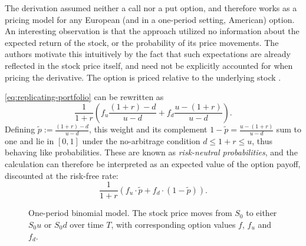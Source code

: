 \documentclass[english,12pt,a4paper,pdftex,sci,utf8]{aaltothesis}
\begin{document}
The derivation assumed neither a call nor a put option, and therefore works as a pricing model for any European (and in a one-period setting, American) option. An interesting observation is that the approach utilized no information about the expected return of the stock, or the probability of its price movements. The authors motivate this intuitively by the fact that such expectations are already reflected in the stock price itself, and need not be explicitly accounted for when pricing the derivative. The option is priced relative to the underlying stock \cite{hull2018}.\clearpage

\cref{eq:replicating-portfolio} can be rewritten as
\begin{equation*}
     \frac{1}{1+r}\left(f_u\frac{(1+r)-d}{u-d}+f_d\frac{u-(1+r)}{u-d}\right).
\end{equation*}
Defining $\tilde{p} := \frac{(1+r)-d}{u-d}$, this weight and its complement $1-\tilde{p} = \frac{u-(1+r)}{u-d}$ sum to one and lie in $[0,1]$ under the no-arbitrage condition $d \leq 1+r \leq u$, thus behaving like probabilities. These are known as \emph{risk-neutral probabilities}, and the calculation can therefore be interpreted as an expected value of the option payoff, discounted at the risk-free rate:
\begin{equation}
     \frac{1}{1+r}(f_u\cdot \tilde p + f_d \cdot (1-\tilde p)).
\label{eq:risk-neutral-expectancy}
\end{equation}

\begin{figure}[tbp]
    \centering
    \caption{One-period binomial model. The stock price moves from $S_0$ to either $S_0u$ or $S_0d$ over time $T$, with corresponding option values $f$, $f_u$ and $f_d$.}
    \label{fig:oneperiodbinom}
\end{figure}
\end{document}
